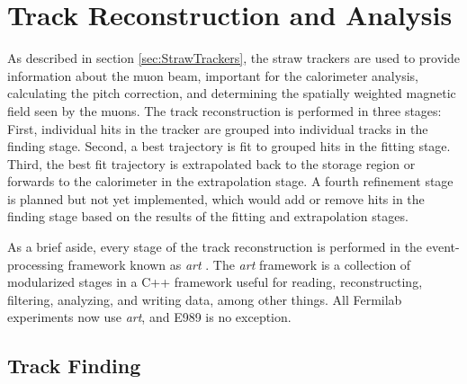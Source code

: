 
\thispagestyle{myheadings}

\graphicspath{{Body/Figures/TrackingFigures/}{Body/Figures/TrackingFigures/MainPlots/}{Body/Figures/TrackingFigures/MainPlots/PlanePlots/}{Body/Figures/TrackingFigures/MainPlots/PullPlots/}{Body/Figures/TrackingFigures/MainPlots/Residuals/}{Body/Figures/TrackingFigures/eLoss/}{Body/Figures/TrackingFigures/CoordSys/}{Body/Figures/TrackingFigures/TrackerPics/}{Body/Figures/TrackingFigures/Field/}{Body/Figures/TrackingFigures/TrackingFlow/}{Body/Figures/TrackingFigures/LeftRight/}{Body/Figures/TrackingFigures/Misc/}{Body/Figures/TrackingFigures/Extrapolation/}{Body/Figures/TrackingFigures/Tracks/}{Body/Figures/TrackingFigures/BeamMeasurements/}{Body/Figures/TrackingFigures/MCDataComparison/}}

\chapter{Track Reconstruction and Analysis}
\label{chapter:TrackReconstruction}

As described in section \ref{sec:StrawTrackers}, the straw trackers are used to provide information about the muon beam, important for the calorimeter \wa analysis, calculating the \wa pitch correction, and determining the spatially weighted magnetic field seen by the muons. The track reconstruction is performed in three stages: First, individual hits in the tracker are grouped into individual tracks in the finding stage. Second, a best trajectory is fit to grouped hits in the fitting stage. Third, the best fit trajectory is extrapolated back to the storage region or forwards to the calorimeter in the extrapolation stage. A fourth refinement stage is planned but not yet implemented, which would add or remove hits in the finding stage based on the results of the fitting and extrapolation stages.

As a brief aside, every stage of the track reconstruction is performed in the event-processing framework known as \textit{art} \cite{art}. The \textit{art} framework is a collection of modularized stages in a C++ framework useful for reading, reconstructing, filtering, analyzing, and writing data, among other things. All Fermilab experiments now use \textit{art}, and E989 is no exception.


\section{Track Finding}
\label{sec:TrackFinding}

